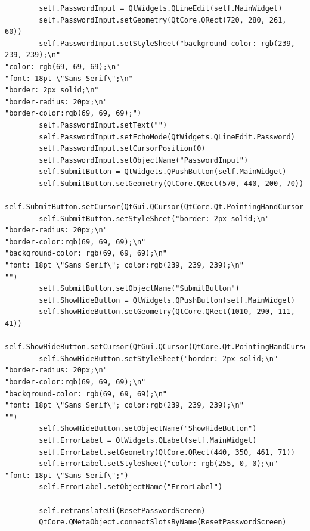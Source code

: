 \documentclass{article}
\begin{document}
\begin{lstlisting}
        self.PasswordInput = QtWidgets.QLineEdit(self.MainWidget)
        self.PasswordInput.setGeometry(QtCore.QRect(720, 280, 261, 60))
        self.PasswordInput.setStyleSheet("background-color: rgb(239, 239, 239);\n"
"color: rgb(69, 69, 69);\n"
"font: 18pt \"Sans Serif\";\n"
"border: 2px solid;\n"
"border-radius: 20px;\n"
"border-color:rgb(69, 69, 69);")
        self.PasswordInput.setText("")
        self.PasswordInput.setEchoMode(QtWidgets.QLineEdit.Password)
        self.PasswordInput.setCursorPosition(0)
        self.PasswordInput.setObjectName("PasswordInput")
        self.SubmitButton = QtWidgets.QPushButton(self.MainWidget)
        self.SubmitButton.setGeometry(QtCore.QRect(570, 440, 200, 70))
        self.SubmitButton.setCursor(QtGui.QCursor(QtCore.Qt.PointingHandCursor))
        self.SubmitButton.setStyleSheet("border: 2px solid;\n"
"border-radius: 20px;\n"
"border-color:rgb(69, 69, 69);\n"
"background-color: rgb(69, 69, 69);\n"
"font: 18pt \"Sans Serif\"; color:rgb(239, 239, 239);\n"
"")
        self.SubmitButton.setObjectName("SubmitButton")
        self.ShowHideButton = QtWidgets.QPushButton(self.MainWidget)
        self.ShowHideButton.setGeometry(QtCore.QRect(1010, 290, 111, 41))
        self.ShowHideButton.setCursor(QtGui.QCursor(QtCore.Qt.PointingHandCursor))
        self.ShowHideButton.setStyleSheet("border: 2px solid;\n"
"border-radius: 20px;\n"
"border-color:rgb(69, 69, 69);\n"
"background-color: rgb(69, 69, 69);\n"
"font: 18pt \"Sans Serif\"; color:rgb(239, 239, 239);\n"
"")
        self.ShowHideButton.setObjectName("ShowHideButton")
        self.ErrorLabel = QtWidgets.QLabel(self.MainWidget)
        self.ErrorLabel.setGeometry(QtCore.QRect(440, 350, 461, 71))
        self.ErrorLabel.setStyleSheet("color: rgb(255, 0, 0);\n"
"font: 18pt \"Sans Serif\";")
        self.ErrorLabel.setObjectName("ErrorLabel")

        self.retranslateUi(ResetPasswordScreen)
        QtCore.QMetaObject.connectSlotsByName(ResetPasswordScreen)


\end{lstlisting}
\end{document}
